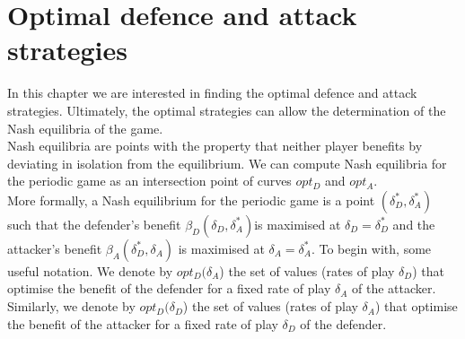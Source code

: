 \chapter{Optimal defence and attack strategies}
\label{chapter:Nash}
%



In this chapter we are interested in finding the optimal defence and attack strategies. Ultimately, the optimal strategies can allow the determination of the Nash equilibria of the game. \\


Nash equilibria are points with the property that neither player benefits by deviating in isolation from the equilibrium. We can compute Nash equilibria for the periodic game as an intersection point of curves $opt_{D}$ and $opt_{A}$. 
\\
More formally, a Nash equilibrium for the periodic game is a point $(\delta_{D}^{*},\delta_{A}^{*})$ such that
the defender's benefit $\beta_{D}(\delta_{D},\delta_{A}^{*}) $is maximised at $\delta_{D}= \delta_{D}^{*}$ and the attacker's benefit
$\beta_{A}(\delta_{D}^{*},\delta_{A}) $ is maximised at $\delta_{A}= \delta_{A}^{*}$.
To begin with, some useful notation. We denote by $opt_{D}(\delta_{A}$) the set of values (rates
of play $\delta_{D}$) that optimise the benefit of the defender for a fixed rate of play $\delta_{A}$ of the
attacker. Similarly, we denote by $opt_{D}(\delta_{D}$) the set of values (rates of play $\delta_{A}$) that optimise
the benefit of the attacker for a fixed rate of play $\delta_{D}$ of the defender. \\



